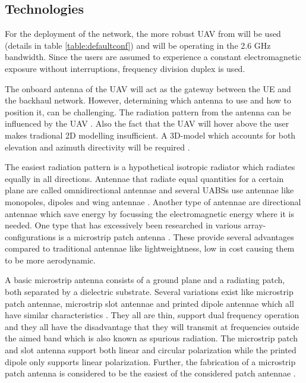 \documentclass[twocolumn]{phdsymp} %
\begin{document}
\subsection{Technologies}

For the deployment of the network, the more robust \gls{UAV} from \cite{J2} will be used (details in table \ref{table:defaultconf}) and will be operating in the 2.6 GHz 
bandwidth. Since the users are assumed to experience a constant electromagnetic exposure without interruptions, frequency division duplex is used.

The onboard antenna of the \gls{UAV} will act as the gateway between the UE and the backhaul network.
However, determining which antenna to use and how to position it, can be challenging.
The radiation pattern from the antenna can be influenced by the \gls{UAV} \cite{A1}.
Also the fact that the \gls{UAV} will hover above the user makes tradional 2D modelling insufficient.
A 3D-model which accounts for both elevation and azimuth directivity 
will be required \cite{U12}.

The easiest radiation pattern is a hypothetical isotropic radiator which radiates equally in all directions.
Antennae that radiate equal quantities for a certain plane are called omnidirectional antennae \cite{U12} and several 
\gls{UABS}s use antennae like monopoles, dipoles and wing antennae \cite{A4,A10,A11,A12}.
Another type of antennae are directional antennae which save energy by focussing the electromagnetic energy where it 
is needed. One type 
that has excessively been researched in various array-configurations is a microstrip patch antenna \cite{A5,A6,A8}.
These provide several advantages compared to traditional antennae \cite{J13_microstripadvantages,J14_antennadesign}
like lightweightness, low in cost causing them to be more aerodynamic. 

A basic microstrip antenna consists of a ground plane and
a radiating patch, both separated by a dielectric substrate. 
Several variations exist like microstrip patch antennae, microstrip slot antennae and printed dipole antennae which
all have similar characteristics \cite{J13_microstripadvantages,J14_antennadesign}. 
They all are thin, support dual frequency operation and they all have the disadvantage that 
they 
will transmit at frequencies outside the aimed band which is also known as
spurious radiation. The microstrip patch and slot antenna support both linear
and circular polarization while the printed dipole only supports linear polarization. 
Further, the fabrication of a microstrip patch antenna is considered to be the easiest 
of the considered patch antennae \cite{J13_microstripadvantages}. 
\end{document}
